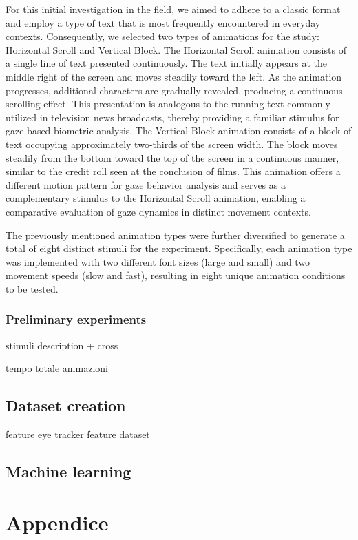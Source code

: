 \documentclass{article}
\begin{document}
For this initial investigation in the field, we aimed to adhere to a classic format and employ a type of text that is most frequently encountered in everyday contexts. 
Consequently, we selected two types of animations for the study: Horizontal Scroll and Vertical Block.
The Horizontal Scroll animation consists of a single line of text presented continuously. 
The text initially appears at the middle right of the screen and moves steadily toward the left. 
As the animation progresses, additional characters are gradually revealed, producing a continuous scrolling effect. 
This presentation is analogous to the running text commonly utilized in television news broadcasts, thereby providing a familiar stimulus for gaze-based biometric analysis.
The Vertical Block animation consists of a block of text occupying approximately two-thirds of the screen width. 
The block moves steadily from the bottom toward the top of the screen in a continuous manner, similar to the credit roll seen at the conclusion of films. 
This animation offers a different motion pattern for gaze behavior analysis and serves as a complementary stimulus to the Horizontal Scroll animation, enabling a comparative evaluation of gaze dynamics in distinct movement contexts.

The previously mentioned animation types were further diversified to generate a total of eight distinct stimuli for the experiment. 
Specifically, each animation type was implemented with two different font sizes (large and small) and two movement speeds (slow and fast), resulting in eight unique animation conditions to be tested.

\subsubsection{Preliminary experiments}




stimuli description + cross

tempo totale animazioni 

\subsection{Dataset creation}
feature eye tracker
feature dataset 

\subsection{Machine learning}

\section{Appendice}
\end{document}
